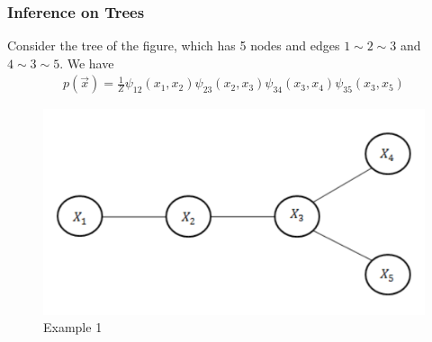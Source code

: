 \documentclass[11pt,a4paper]{article}
\begin{document}
\subsubsection{Inference on Trees}
Consider the tree of the figure, which has 5 nodes and edges $1\sim 2\sim 3$ and $4\sim 3\sim 5$. We have
\begin{equation}
    \begin{aligned}
        p(\vec{x})=\frac{1}{Z}\psi_{12}(x_1,x_2)\psi_{23}(x_2,x_3)\psi_{34}(x_3,x_4)\psi_{35}(x_3,x_5)
    \end{aligned}
    \nonumber
\end{equation}
\begin{center}\begin{figure}[htbp]
    \centering
    \includegraphics[scale=0.2]{inftree.png}
    \caption{Example 1}
    \label{}
\end{figure}\end{center}
\end{document}
